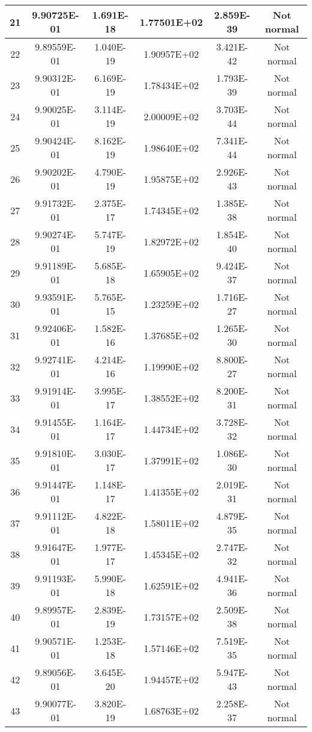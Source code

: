 \begin{table}[h]
\begin{tabular}{|c|c|c|c|c|c|}
		21 & 9.90725E-01 & 1.691E-18 & 1.77501E+02 & 2.859E-39 & Not normal\\\hline
		22 & 9.89559E-01 & 1.040E-19 & 1.90957E+02 & 3.421E-42 & Not normal\\\hline
		23 & 9.90312E-01 & 6.169E-19 & 1.78434E+02 & 1.793E-39 & Not normal\\\hline
		24 & 9.90025E-01 & 3.114E-19 & 2.00009E+02 & 3.703E-44 & Not normal\\\hline
		25 & 9.90424E-01 & 8.162E-19 & 1.98640E+02 & 7.341E-44 & Not normal\\\hline
		26 & 9.90202E-01 & 4.790E-19 & 1.95875E+02 & 2.926E-43 & Not normal\\\hline
		27 & 9.91732E-01 & 2.375E-17 & 1.74345E+02 & 1.385E-38 & Not normal\\\hline
		28 & 9.90274E-01 & 5.747E-19 & 1.82972E+02 & 1.854E-40 & Not normal\\\hline
		29 & 9.91189E-01 & 5.685E-18 & 1.65905E+02 & 9.424E-37 & Not normal\\\hline
		30 & 9.93591E-01 & 5.765E-15 & 1.23259E+02 & 1.716E-27 & Not normal\\\hline
		31 & 9.92406E-01 & 1.582E-16 & 1.37685E+02 & 1.265E-30 & Not normal\\\hline
		32 & 9.92741E-01 & 4.214E-16 & 1.19990E+02 & 8.800E-27 & Not normal\\\hline
		33 & 9.91914E-01 & 3.995E-17 & 1.38552E+02 & 8.200E-31 & Not normal\\\hline
		34 & 9.91455E-01 & 1.164E-17 & 1.44734E+02 & 3.728E-32 & Not normal\\\hline
		35 & 9.91810E-01 & 3.030E-17 & 1.37991E+02 & 1.086E-30 & Not normal\\\hline
		36 & 9.91447E-01 & 1.148E-17 & 1.41355E+02 & 2.019E-31 & Not normal\\\hline
		37 & 9.91112E-01 & 4.822E-18 & 1.58011E+02 & 4.879E-35 & Not normal\\\hline
		38 & 9.91647E-01 & 1.977E-17 & 1.45345E+02 & 2.747E-32 & Not normal\\\hline
		39 & 9.91193E-01 & 5.990E-18 & 1.62591E+02 & 4.941E-36 & Not normal\\\hline
		40 & 9.89957E-01 & 2.839E-19 & 1.73157E+02 & 2.509E-38 & Not normal\\\hline
		41 & 9.90571E-01 & 1.253E-18 & 1.57146E+02 & 7.519E-35 & Not normal\\\hline
		42 & 9.89056E-01 & 3.645E-20 & 1.94457E+02 & 5.947E-43 & Not normal\\\hline
		43 & 9.90077E-01 & 3.820E-19 & 1.68763E+02 & 2.258E-37 & Not normal\\\hline

\end{tabular}
\end{table}
